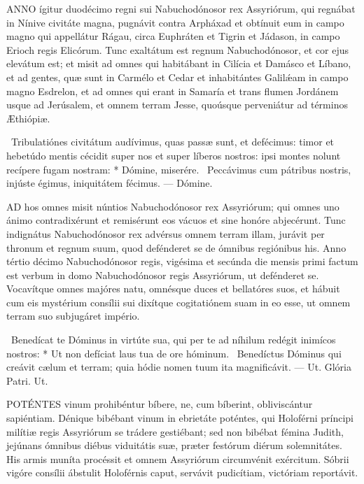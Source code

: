 \lettrine[lines=2]{A}{NNO} ígitur duodécimo regni sui Nabuchodónosor rex Assyriórum, qui regnábat in Nínive civitáte magna, pugnávit contra Arpháxad et obtínuit eum in campo magno qui appellátur Rágau, circa Euphráten et Tigrin et Jádason, in campo Erioch regis Elicórum. Tunc exaltátum est regnum Nabuchodónosor, et cor ejus elevátum est; et misit ad omnes qui habitábant in Cilícia et Damásco et Líbano, et ad gentes, quæ sunt in Carmélo et Cedar et inhabitántes Galilǽam in campo magno Esdrelon, et ad omnes qui erant in Samaría et trans flumen Jordánem usque ad Jerúsalem, et omnem terram Jesse, quoúsque perveniátur ad términos Æthiópiæ.

\R\ Tribulatiónes civitátum audívimus, quas passæ sunt, et defécimus: timor et hebetúdo mentis cécidit super nos et super líberos nostros: ipsi montes nolunt recípere fugam nostram: * Dómine, miserére. \V\ Peccávimus cum pátribus nostris, injúste égimus, iniquitátem fécimus. — Dómine.


\lettrine[lines=2]{A}{D} hos omnes misit núntios Nabuchodónosor rex Assyriórum; qui omnes uno ánimo contradixérunt et remisérunt eos vácuos et sine honóre abjecérunt. Tunc indignátus Nabuchodónosor rex advérsus omnem terram illam, jurávit per thronum et regnum suum, quod defénderet se de ómnibus regiónibus his. Anno tértio décimo Nabuchodónosor regis, vigésima et secúnda die mensis primi factum est verbum in domo Nabuchodónosor regis Assyriórum, ut defénderet se. Vocavítque omnes majóres natu, omnésque duces et bellatóres suos, et hábuit cum eis mystérium consílii sui dixítque cogitatiónem suam in eo esse, ut omnem terram suo subjugáret império.

\R\ Benedícat te Dóminus in virtúte sua, qui per te ad níhilum redégit inimícos nostros: * Ut non defíciat laus tua de ore hóminum. \V\ Benedíctus Dóminus qui creávit cælum et terram; quia hódie nomen tuum ita magnificávit. — Ut. Glória Patri. Ut.




\lettrine[lines=2]{P}{OTÉNTES} vinum prohibéntur bíbere, ne, cum bíberint, obliviscántur sapiéntiam. Dénique bibébant vinum in ebrietáte poténtes, qui Holoférni príncipi milítiæ regis Assyriórum se trádere gestiébant; sed non bibébat fémina Judith, jejúnans ómnibus diébus viduitátis suæ, præter festórum diérum solemnitátes. His armis muníta procéssit et omnem Assyriórum circumvénit exércitum. Sóbrii vigóre consílii ábstulit Holoférnis caput, servávit pudicítiam, victóriam reportávit.

